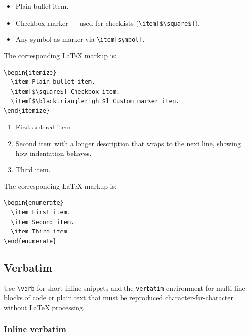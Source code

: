\documentclass{wpom-upv}
\begin{document}
\begin{itemize}
  \item Plain bullet item.
  \item[$\square$] Checkbox marker — used for checklists
        (\verb|\item[$\square$]|).
  \item[$\blacktriangleright$] Any symbol as marker via
        \verb|\item[symbol]|.
\end{itemize}

The corresponding \LaTeX{} markup is:

\begin{verbatim}
\begin{itemize}
  \item Plain bullet item.
  \item[$\square$] Checkbox item.
  \item[$\blacktriangleright$] Custom marker item.
\end{itemize}
\end{verbatim}

\begin{enumerate}
  \item First ordered item.
  \item Second item with a longer description that wraps to the next
        line, showing how indentation behaves.
  \item Third item.
\end{enumerate}

The corresponding \LaTeX{} markup is:

\begin{verbatim}
\begin{enumerate}
  \item First item.
  \item Second item.
  \item Third item.
\end{enumerate}
\end{verbatim}

\subsection{Verbatim}

Use \verb|\verb| for short inline snippets and the \texttt{verbatim}
environment for multi-line blocks of code or plain text that must be
reproduced character-for-character without \LaTeX{} processing.

\subsubsection{Inline verbatim}
\end{document}
